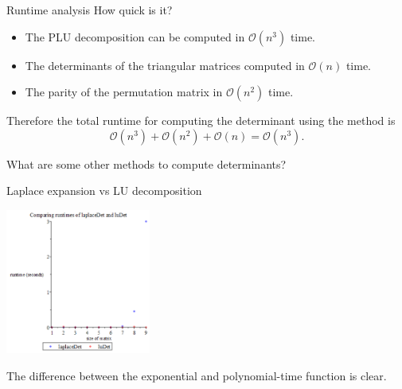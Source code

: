 \documentclass[handout]{beamer}
\begin{document}
\begin{frame}{Runtime analysis}
    How quick is it?
    \begin{itemize}
        \item The PLU decomposition can be computed in $\mathcal{O}(n^3)$ time.
        \item The determinants of the triangular matrices computed in $\mathcal{O}(n)$ time.
        \item The parity of the permutation matrix in $\mathcal{O}(n^2)$ time.
    \end{itemize}

    Therefore the total runtime for computing the determinant using the method is
    \[
        \mathcal{O}(n^3) + \mathcal{O}(n^2) + \mathcal{O}(n) = \mathcal{O}(n^3).
    \]

    \pause{}

    \begin{exampleblock}{}
        What are some other methods to compute determinants?
    \end{exampleblock}

\end{frame}


\begin{frame}{Laplace expansion vs LU decomposition}

    \begin{center}{}
        \includegraphics[height=180]{laplace-lu}
    \end{center}

    The difference between the exponential and polynomial-time function is clear.
\end{frame}
\end{document}
